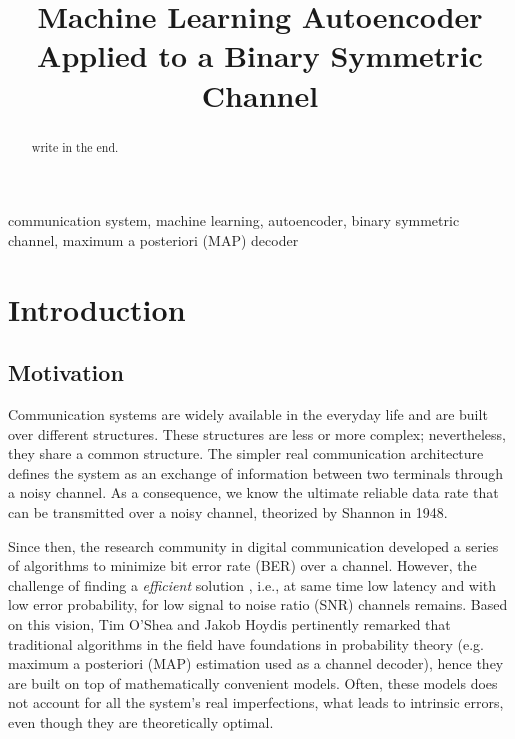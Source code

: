 \documentclass[conference]{IEEEtran}
\begin{document}
\title{Machine Learning Autoencoder Applied to a Binary Symmetric Channel}


\author{
}


\maketitle

\begin{abstract}

write in the end.

\end{abstract}

\begin{IEEEkeywords}
communication system, machine learning, autoencoder, binary symmetric channel, maximum a posteriori (MAP) decoder 
\end{IEEEkeywords}

\section{Introduction}
\subsection{Motivation}
Communication systems are widely available in the everyday life and are built over different structures. These structures are less or more complex; nevertheless, they share a common structure. The simpler real communication architecture defines the system as an exchange of information between two terminals through a noisy channel. As a consequence, we know the ultimate reliable data rate that can be transmitted over a noisy channel, theorized by Shannon \cite{b1} in 1948. 

Since then, the research community in digital communication developed a series of algorithms to minimize bit error rate (BER) over a channel. However, the challenge of finding a \textit{efficient} solution , i.e., at same time low latency and with low error probability, for low signal to noise ratio (SNR) channels remains. Based on this vision, Tim O'Shea and Jakob Hoydis \cite{b2} pertinently remarked that traditional algorithms in the field have foundations in probability theory (e.g. maximum a posteriori (MAP) estimation used as a channel decoder), hence they are built on top of mathematically convenient models. Often, these models does not account for all the system's real imperfections, what leads to intrinsic errors, even though they are theoretically optimal. 
\end{document}
